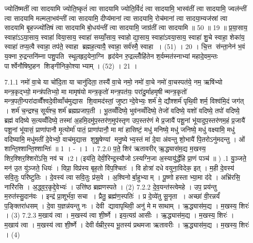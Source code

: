 ज्योति॑ष्मतीं त्वा सादयामि ज्योति॒ष्कृतं॑ त्वा सादयामि ज्योति॒र्विदं॑ त्वा सादयामि॒ भास्व॑तीं त्वा सादयामि॒ ज्वल॑न्तीं त्वा सादयामि मल्मला॒भव॑न्तीं त्वा सादयामि॒ दीप्य॑मानां त्वा सादयामि॒ रोच॑मानां त्वा सादया॒म्यज॑स्रां त्वा सादयामि बृ॒हज्ज्यो॑तिषं त्वा सादयामि बो॒धय॑न्तीं त्वा सादयामि॒ जाग्र॑तीं त्वा सादयामि ॥ 50 ॥ 19 ॥
प्र॒या॒साय॒ स्वाहा॑ऽऽया॒साय॒ स्वाहा॑ विया॒साय॒ स्वाहा॑ सय्याँ॒साय॒ स्वाहोद्या॒साय॒ स्वाहा॑ऽवया॒साय॒ स्वाहा॑ शु॒चे स्वाहा॒ शेका॑य॒ स्वाहा॑ तप्य॒त्वै स्वाहा॒ तप॑ते॒ स्वाहा ब्रह्मह॒त्यायै॒ स्वाहा॒ सर्व॑स्मै॒ स्वाहा । (51) । 20 ।
चि॒त्त स॑न्ता॒नेन॑ भ॒वं य॒क्ना रु॒द्रन्तनि॑म्ना पशु॒पति स्थूलहृद॒येना॒ग्नि हृद॑येन रु॒द्रल्लोँहि॑तेन श॒र्वम्मत॑स्नाभ्यां महादे॒वम॒न्तः पार्श्वेनौषिष्ठ॒हन शिङ्गीनिको॒श्याभ्याम् । (52) । 21 ।
\anuvakamend

\setcounter{anuvakam}{0}
7.1.1
नमो॑ वा॒चे या चो॑दि॒ता या चानु॑दिता॒ तस्यै॑ वा॒चे नमो॒ नमो॑ वा॒चे नमो॑ वा॒चस्पत॑ये॒ नम॒ ऋषि॑भ्यो मन्त्र॒कृद्भ्यो॒ मन्त्र॑पतिभ्यो॒ मा मामृष॑यो मन्त्र॒कृतो॑ मन्त्र॒पत॑यः॒ परा॑दु॒र्माहमृषीन्मन्त्र॒कृतो॑ मन्त्र॒पती॒न्परा॑दाव्वैँश्वदे॒वीव्वाँच॑मुद्यास शि॒वामद॑स्तां॒ जुष्टान्दे॒वेभ्यः॒ शर्म॑ मे॒ द्यौश्शर्म॑ पृथि॒वी शर्म॒ विश्व॑मि॒दं जग॑त् । शर्म॑ च॒न्द्रश्च॒ सूर्य॑श्च॒ शर्म॑ ब्रह्मप्रजाप॒ती । भू॒तव्वँ॑दिष्ये॒ भुव॑नव्वँदिष्ये॒ तेजो॑ वदिष्ये॒ यशो॑ वदिष्ये॒ तपो॑ वदिष्ये॒ ब्रह्म॑ वदिष्ये स॒त्यव्वँ॑दिष्ये॒ तस्मा॑ अ॒हमि॒दमु॑प॒स्तर॑ण॒मुप॑स्तृण उप॒स्तर॑णं मे प्र॒जायै॑ पशू॒नां भू॑यादुप॒स्तर॑णम॒हं प्र॒जायै॑ पशू॒नां भू॑यासं॒ प्राणा॑पानौ मृ॒त्योर्मा॑ पातं॒ प्राणा॑पानौ॒ मा मा॑ हासिष्टं॒ मधु॑ मनिष्ये॒ मधु॑ जनिष्ये॒ मधु॑ वक्ष्यामि॒ मधु॑ वदिष्यामि॒ मधु॑मतीं दे॒वेभ्यो॒ वाच॑मुद्यास शुश्रू॒षेण्यां मनु॒ष्येभ्य॒स्तं मा॑ दे॒वा अ॑वन्तु शो॒भायै॑ पि॒तरोऽनु॑मदन्तु । ओं शान्ति॒श्शान्ति॒श्शान्तिः॑ ॥ 1 । - । 1 ।
7.2.0
प॒ते॒ शिर॑ ऋतावरीर् ऋ॒द्ध्यास॑म॒द्य म॒खस्य॒ शिर॒श्शिर॒श्शिरो॑ऽसि॒ नव॑ च ।2। (इय॑ति॒ देवी॒रिन्द्र॒स्यौजोऽस्यग्नि॒जा अ॒स्यायु॑र्द्धेहि प्रा॒णं पञ्च॑ ॥ )
.1
यु॒ञ्जते॒ मन॑ उ॒त यु॑ञ्जते॒ धियः॑ । विप्रा॒ विप्र॑स्य बृह॒तो वि॑प॒श्चितः॑ । वि होत्रा॑ दधे वयुना॒विदेक॒ इत् । म॒ही दे॒वस्य॑ सवि॒तुः परि॑ष्टुतिः । दे॒वस्य॑ त्वा सवि॒तुः प्र॑स॒वे । अ॒श्विनोर्बा॒हुभ्याम् । पू॒ष्णो हस्ताभ्या॒मा द॑दे । अभ्रि॑रसि॒ नारि॑रसि । अ॒द्ध्व॒र॒कृद्दे॒वेभ्यः॑ । उत्ति॑ष्ठ ब्रह्मणस्पते । (2)
7.2.2
दे॒व॒यन्त॑स्त्वेमहे । उप॒ प्रय॑न्तु म॒रुत॑स्सु॒दान॑वः । इन्द्र॑ प्रा॒शूर्भ॑वा॒ सचा । प्रैतु॒ ब्रह्म॑ण॒स्पतिः॑ । प्र दे॒व्ये॑तु सू॒नृता । अच्छा॑ वी॒रन्नर्यं॑ प॒ङ्क्तिरा॑धसम् । दे॒वा य॒ज्ञन्न॑यन्तु नः । देवी द्यावापृथिवी॒ अनु॑ मे मसाथाम् । ऋ॒द्ध्यास॑म॒द्य । म॒खस्य॒ शिरः॑ । (3)
7.2.3
म॒खाय॑ त्वा । म॒खस्य॑ त्वा शी॒र्ष्णे । इय॒त्यग्र॑ आसीः । ऋ॒द्ध्यास॑म॒द्य । म॒खस्य॒ शिरः॑ । म॒खाय॑ त्वा । म॒खस्य॑ त्वा शी॒र्ष्णे । देवीर्वम्रीर॒स्य भू॒तस्य॑ प्रथमजा ऋतावरीः । ऋ॒द्ध्यास॑म॒द्य । म॒खस्य॒ शिरः॑ । (4)
